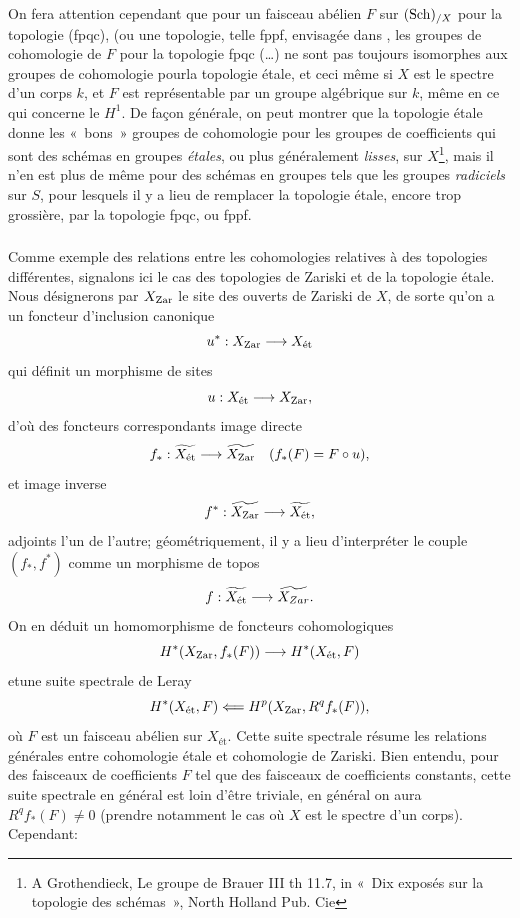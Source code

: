 \documentclass[10pt]{../fichiers-configuration-latex/smfart}
\begin{document}
\subsubsection{}

On fera attention cependant que pour un faisceau abélien $F$ sur
$(\operatorname{Sch})_{/X}$ pour la topologie (fpqc), (ou une topologie, telle
fppf, envisagée dans , les  groupes de cohomologie de $F$ pour
la topologie fpqc (\resp\ldots) ne sont pas toujours isomorphes aux
groupes de cohomologie pour\pageoriginale la topologie étale, et
ceci même si $X$ est le spectre d'un corps $k$, et $F$ est
représentable par un groupe algébrique sur $k$, même en ce qui
concerne le $H^{1}$. De façon générale, on peut montrer que la
topologie étale donne les « bons » groupes de cohomologie pour
les groupes de coefficients qui sont des schémas en groupes
\emph{étales}, ou plus généralement \emph{lisses}, sur
$X$\footnote{\Cf A Grothendieck, Le groupe de Brauer III th 11.7, in
« Dix exposés sur la topologie des schémas », North Holland Pub.
Cie}, mais il n'en est plus de même pour des schémas en groupes tels
que les groupes \emph{radiciels} sur $S$, pour lesquels il y a lieu
de remplacer la topologie étale, encore trop grossière, par la
topologie fpqc, ou fppf.

\subsubsection{}

Comme exemple des relations entre les cohomologies relatives à des
topologies différentes, signalons ici le cas des topologies de Zariski
et de la topologie étale. Nous désignerons par $X_{\operatorname{Zar}}$ le site des
ouverts de Zariski de $X$, de sorte qu'on a un foncteur d'inclusion
canonique
$$
u^{\ast} : X_{\Zar} \to X_{\text{ét}}
$$
qui définit un morphisme de sites
$$
u : X_{\text{ét}} \to X_{\Zar}{\quoi},
$$
d'où des foncteurs correspondants image directe
$$
f_{\ast} : \widetilde{X_{\text{ét}}} \to \widetilde{X_{\Zar}}\quad
(f_{\ast} (F) = F \circ u){\quoi},
$$
et image inverse
$$
f^{\ast} : \widetilde{X_{\Zar}} \to \widetilde{X_{\text{ét}}}{\quoi},
$$
adjoints l'un de l'autre; géométriquement, il y a lieu d'interpréter
le couple $(f_{\ast}, f^{\ast})$ comme un morphisme de topos
$$
f : \widetilde{X_{\text{ét}}} \to \widetilde{X_{Zar}}{\quoi}.
$$
On en déduit un homomorphisme de foncteurs cohomologiques
$$
H^{\ast} (X_{\Zar}, f_{\ast} (F)) \to H^{\ast} (X_{\text{ét}}, F)
$$
et\pageoriginale une suite spectrale de Leray
$$
H^{\ast} (X_{\text{ét}}, F) \Longleftarrow H^{p} (X_{\operatorname{Zar}}, R^q
f_{\ast} (F)){},
$$
où $F$ est un faisceau abélien sur $X_{\text{ét}}$. Cette suite spectrale
résume les relations générales entre cohomologie étale et cohomologie
de Zariski. Bien entendu, pour des faisceaux de coefficients $F$ tel
que des faisceaux de coefficients constants, cette suite spectrale en
général est loin d'être triviale, \ie en général on aura $R^q f_{\ast}
(F) \neq 0$  (prendre notamment le cas où $X$ est le spectre d'un
corps). Cependant:
\end{document}
